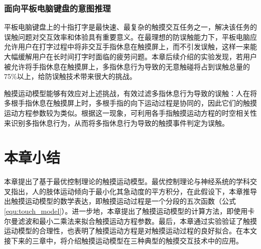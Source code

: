 
\subsubsection{面向平板电脑键盘的意图推理}

平板电脑键盘上的十指打字是最快速、最复杂的触摸交互任务之一，解决该任务的误触问题对交互效率和体验具有重要意义\cite{gu2021typeboard}。在最理想的防误触能力下，平板电脑应允许用户在打字过程中将非交互手指休息在触摸屏上，而不引发误触，这样一来能大幅缓解用户在长时间打字时面临的疲劳问题。本章后续介绍的实验发现，若用户被允许将手指休息在触摸屏上，多指休息行为导致的无意触碰将占到误触总量的75\%以上，给防误触技术带来很大的挑战。

触摸运动模型能够有效应对上述挑战，有效过滤多指休息行为导致的误触：人在将多根手指休息在触摸屏上时，多根手指的向下运动过程是协同的，因此它们的触摸运动方程参数较为类似。根据这一现象，可利用各手指触摸运动方程的时空相关性来识别多指休息行为，从而将多指休息行为导致的触摸事件判定为误触。



\section{本章小结}

本章提出了基于最优控制理论的触摸运动模型。最优控制理论与神经系统的学科交叉\cite{flash1985coordination}指出，人的肢体运动倾向于最小化其急动度的平方积分，在此假设下，本章推导出触摸运动模型的数学表达，即触摸运动过程是一个分段的五次函数（公式\ref{equ:touch_model}）。进一步地，本章提出了触摸运动模型的计算方法，即使用卡尔曼滤波和最小二乘法来拟合触摸运动方程参数。最后，本章通过实验验证了触摸运动模型的合理性，也表明了触摸运动方程是对触摸运动过程的良好拟合。在本文接下来的三章中，将介绍触摸运动模型在三种典型的触摸交互技术中的应用。
